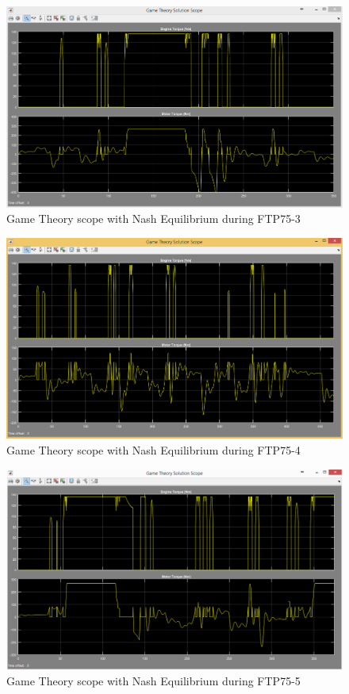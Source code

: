 \begin{figure}[h]
\centering
\includegraphics[scale=0.45]{figures/NashEquilibrium/FTP75-3/gameTheory15Juni}
\caption{Game Theory scope with Nash Equilibrium during FTP75-3}
\label{fig:gtne3}
\end{figure}


\begin{figure}[h]
\centering
\includegraphics[scale=0.45]{figures/NashEquilibrium/FTP75-4/gameTheory15Juni}
\caption{Game Theory scope with Nash Equilibrium during FTP75-4}
\label{fig:gtne4}
\end{figure}


\begin{figure}[h]
\centering
\includegraphics[scale=0.45]{figures/NashEquilibrium/FTP75-5/gameTheory16Juni}
\caption{Game Theory scope with Nash Equilibrium during FTP75-5}
\label{fig:gtne5}
\end{figure}


